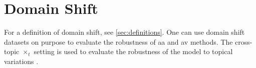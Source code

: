\section{Domain Shift}
\label{sec:domain_shift}

For a definition of domain shift, see \autoref{sec:definitions}.
One can use domain shift datasets on purpose to evaluate the robustness of \ac{aa} and \ac{av} methods.
The cross-topic $\times_t$ setting is used to evaluate the robustness of the model to topical variations \citep{tyo_state_2022}.